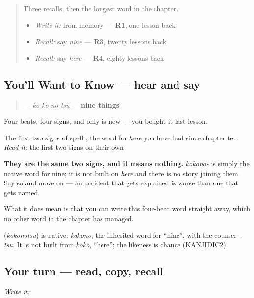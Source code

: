 \begin{quote}
Three recalls, then the longest word in the chapter.

\begin{itemize}
\raggedright
  \item \emph{Write it:} \textbf{} from memory — \textbf{R1}, one lesson back
  \item \emph{Recall:} say \emph{nine} — \textbf{R3}, twenty lessons back
  \item \emph{Recall:} say \emph{here} — \textbf{R4}, eighty lessons back
\end{itemize}
\end{quote}

\subsection*{You'll Want to Know — hear and say}
\begin{quote}
\textbf{} — \emph{ko-ko-no-tsu} — \textbf{nine things}
\end{quote}

Four beats, four signs, and only \textbf{} is new — you bought it last lesson.

The first two signs of \textbf{} spell \textbf{}, the word for \emph{here} you have had since chapter ten. \emph{Read it:} the first two signs on their own

\textbf{They are the same two signs, and it means nothing.} \emph{kokono-} is simply the native word for nine; it is not built on \emph{here} and there is no story joining them. Say so and move on — an accident that gets explained is worse than one that gets named.

What it does mean is that you can write this four-beat word straight away, which no other word in the chapter has managed.

\begin{cousinweb}
\textbf{} (\emph{kokonotsu}) is native: \emph{kokono}, the inherited word for \textquotedblleft{}nine\textquotedblright{}, with the counter \emph{-tsu}. It is not built from \emph{koko}, \textquotedblleft{}here\textquotedblright{}; the likeness is chance (KANJIDIC2).
\end{cousinweb}

\subsection*{Your turn — read, copy, recall}
\emph{Write it:} \textbf{}

